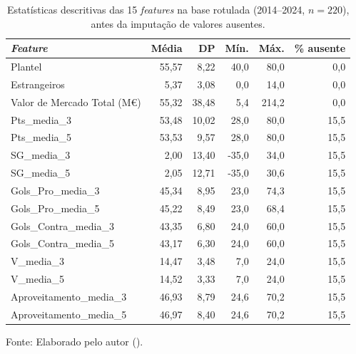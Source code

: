 \begin{table}[htbp]
    \centering
    \caption[Estatísticas descritivas das \textit{features}]{Estatísticas descritivas das 15 \textit{features} na base rotulada (2014--2024, $n = 220$), antes da imputação de valores ausentes.}
    \label{tab:aed}
    \small
    \begin{tabular}{lrrrrr}
        \toprule
        \textbf{\textit{Feature}} & \textbf{Média} & \textbf{DP} & \textbf{Mín.} & \textbf{Máx.} & \textbf{\% ausente} \\
        \midrule
        Plantel & 55,57 & 8,22 & 40,0 & 80,0 & 0,0 \\
        Estrangeiros & 5,37 & 3,08 & 0,0 & 14,0 & 0,0 \\
        Valor de Mercado Total (M\euro) & 55,32 & 38,48 & 5,4 & 214,2 & 0,0 \\
        Pts\_media\_3 & 53,48 & 10,02 & 28,0 & 80,0 & 15,5 \\
        Pts\_media\_5 & 53,53 & 9,57 & 28,0 & 80,0 & 15,5 \\
        SG\_media\_3 & 2,00 & 13,40 & -35,0 & 34,0 & 15,5 \\
        SG\_media\_5 & 2,05 & 12,71 & -35,0 & 30,6 & 15,5 \\
        Gols\_Pro\_media\_3 & 45,34 & 8,95 & 23,0 & 74,3 & 15,5 \\
        Gols\_Pro\_media\_5 & 45,22 & 8,49 & 23,0 & 68,4 & 15,5 \\
        Gols\_Contra\_media\_3 & 43,35 & 6,80 & 24,0 & 60,0 & 15,5 \\
        Gols\_Contra\_media\_5 & 43,17 & 6,30 & 24,0 & 60,0 & 15,5 \\
        V\_media\_3 & 14,47 & 3,48 & 7,0 & 24,0 & 15,5 \\
        V\_media\_5 & 14,52 & 3,33 & 7,0 & 24,0 & 15,5 \\
        Aproveitamento\_media\_3 & 46,93 & 8,79 & 24,6 & 70,2 & 15,5 \\
        Aproveitamento\_media\_5 & 46,97 & 8,40 & 24,6 & 70,2 & 15,5 \\
        \bottomrule
    \end{tabular}

    \vspace{2pt}
    {\small Fonte: Elaborado pelo autor (\the\year).}
\end{table}
